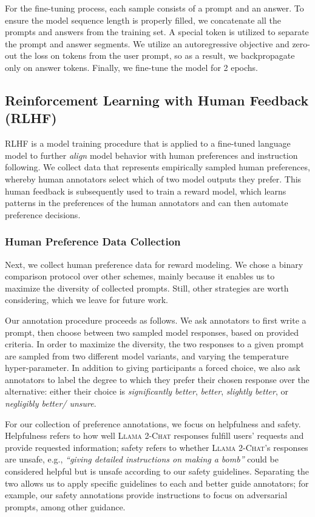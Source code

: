 For the fine-tuning process, each sample consists of a prompt and an answer. To ensure the model sequence length is properly filled, we concatenate all the prompts and answers from the training set. A special token is utilized to separate the prompt and answer segments. We utilize an autoregressive objective and zero-out the loss on tokens from the user prompt, so as a result, we backpropagate only on answer tokens. Finally, we fine-tune the model for 2 epochs.

\subsection{Reinforcement Learning with Human Feedback (RLHF)}
\label{subsec:RLHF}

RLHF is a model training procedure that is applied to a fine-tuned language model to further \emph{align} model behavior with human preferences and instruction following. We collect data that represents empirically sampled human preferences, whereby human annotators select which of two model outputs they prefer. This human feedback is subsequently used to train a reward model, which learns patterns in the preferences of the human annotators and can then automate preference decisions. 

\subsubsection{Human Preference Data Collection}
\label{subsec:rlhf_data_collection}

Next, we collect human preference data for reward modeling. We chose a binary comparison protocol over other schemes, mainly because it enables us to maximize the diversity of collected prompts. Still, other strategies are worth considering, which we leave for future work.

Our annotation procedure proceeds as follows. We ask annotators to first write a prompt, then choose between two sampled model responses, based on provided criteria. In order to maximize the diversity, the two responses to a given prompt are sampled from two different model variants, and varying the temperature hyper-parameter. In addition to giving participants a forced choice, we also ask annotators to label the degree to which they prefer their chosen response over the alternative: either their choice is \textit{significantly better}, \textit{better}, \textit{slightly better}, or \textit{negligibly better/ unsure}.

For our collection of preference annotations, we focus on helpfulness and safety. Helpfulness refers to how well \textsc{Llama 2-Chat}  responses fulfill users' requests and provide requested information; safety refers to whether \textsc{Llama 2-Chat}'s responses are unsafe, e.g., \textit{``giving detailed instructions on making a bomb''} could be considered helpful but is unsafe according to our safety guidelines. Separating the two allows us to apply specific guidelines to each and better guide annotators; for example, our safety annotations provide instructions to focus on adversarial prompts, among other guidance.

